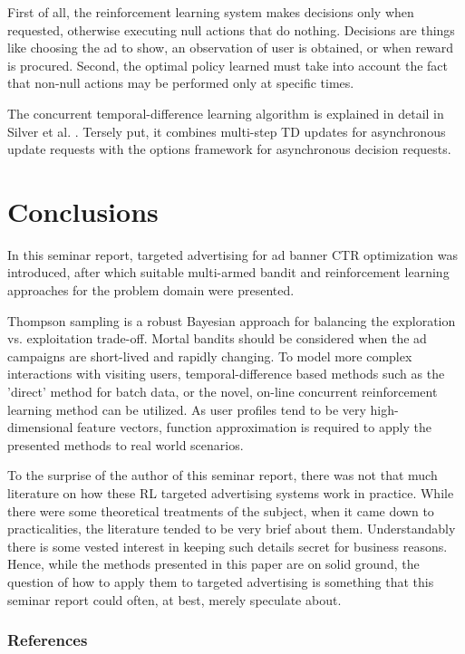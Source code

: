 \documentclass{article} %
\begin{document}
First of all, the reinforcement learning system makes decisions only when
requested, otherwise executing null actions that do nothing. Decisions are
things like choosing the ad to show, an observation of user is obtained, or
when reward is procured. Second, the optimal policy learned must take into
account the fact that non-null actions may be performed only at specific times.

The concurrent temporal-difference learning algorithm is explained in detail in
Silver et al. \cite{silver2013concurrent}. Tersely put, it combines multi-step
TD updates for asynchronous update requests with the options framework for
asynchronous decision requests.


\section{Conclusions}
In this seminar report, targeted advertising for ad banner CTR optimization
was introduced, after which suitable multi-armed bandit and reinforcement
learning approaches for the problem domain were presented.

Thompson sampling is a robust Bayesian approach for balancing the exploration
vs. exploitation trade-off. Mortal bandits should be considered when the ad
campaigns are short-lived and rapidly changing. To model more complex
interactions with visiting users, temporal-difference based methods such as the
'direct' method for batch data, or the novel, on-line concurrent reinforcement
learning method can be utilized. As user profiles tend to be very
high-dimensional feature vectors, function approximation is required to apply
the presented methods to real world scenarios.

To the surprise of the author of this seminar report, there was not that much
literature on how these RL targeted advertising systems work in practice. While
there were some theoretical treatments of the subject, when it came down to
practicalities, the literature tended to be very brief about them.
Understandably there is some vested interest in keeping such details secret for
business reasons. Hence, while the methods presented in this paper are on solid
ground, the question of how to apply them to targeted advertising is something
that this seminar report could often, at best, merely speculate about.

\subsubsection*{References}

\printbibliography[heading=none]
\end{document}
